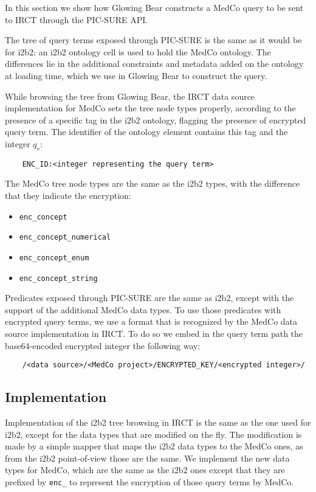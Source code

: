 In this section we show how Glowing Bear constructs a MedCo query to be sent to IRCT through the PIC-SURE API.

The tree of query terms exposed through PIC-SURE is the same as it would be for i2b2: an i2b2 ontology cell is used to hold the MedCo ontology. 
The differences lie in the additional constraints and metadata added on the ontology at loading time, which we use in Glowing Bear to construct the query.

While browsing the tree from Glowing Bear, the IRCT data source implementation for MedCo sets the tree node types properly, according to the presence of a specific tag in the i2b2 ontology, flagging the presence of encrypted query term.
The identifier of the ontology element contains this tag and the integer $q_v$:
\begin{verbatim}
    ENC_ID:<integer representing the query term>
\end{verbatim}

The MedCo tree node types are the same as the i2b2 types, with the difference that they indicate the encryption:
\begin{itemize}    
    \setlength\itemsep{0em}

    \item \verb|enc_concept|
    \item \verb|enc_concept_numerical|
    \item \verb|enc_concept_enum|
    \item \verb|enc_concept_string|
\end{itemize}

Predicates exposed through PIC-SURE are the same as i2b2, except with the support of the additional MedCo data types.
To use those predicates with encrypted query terms, we use a format that is recognized by the MedCo data source implementation in IRCT. 
To do so we embed in the query term path the base64-encoded encrypted integer the following way:
\begin{verbatim}
    /<data source>/<MedCo project>/ENCRYPTED_KEY/<encrypted integer>/
\end{verbatim}


\subsection{Implementation}

Implementation of the i2b2 tree browsing in IRCT is the same as the one used for i2b2, except for the data types that are modified on the fly.
The modification is made by a simple mapper that maps the i2b2 data types to the MedCo ones, as from the i2b2 point-of-view those are the same.
We implement the new data types for MedCo, which are the same as the i2b2 ones except that they are prefixed by \verb|enc_| to represent the encryption of those query terms by MedCo.


